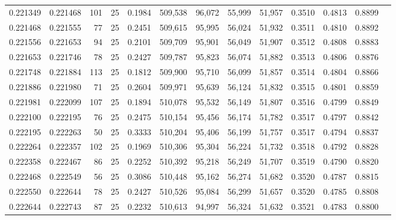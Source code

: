 \begin{tabular}{rrrrrrrrrrrrr}
0.221349 & 0.221468 &   101 &  25 &                                     0.1984 & 509,538 &  96,072 &  55,999 &  51,957 & 0.3510 & 0.4813 & 0.8899 \\
0.221468 & 0.221555 &    77 &  25 &                                     0.2451 & 509,615 &  95,995 &  56,024 &  51,932 & 0.3511 & 0.4810 & 0.8892 \\
0.221556 & 0.221653 &    94 &  25 &                                     0.2101 & 509,709 &  95,901 &  56,049 &  51,907 & 0.3512 & 0.4808 & 0.8883 \\
0.221653 & 0.221746 &    78 &  25 &                                     0.2427 & 509,787 &  95,823 &  56,074 &  51,882 & 0.3513 & 0.4806 & 0.8876 \\
0.221748 & 0.221884 &   113 &  25 &                                     0.1812 & 509,900 &  95,710 &  56,099 &  51,857 & 0.3514 & 0.4804 & 0.8866 \\
0.221886 & 0.221980 &    71 &  25 &                                     0.2604 & 509,971 &  95,639 &  56,124 &  51,832 & 0.3515 & 0.4801 & 0.8859 \\
0.221981 & 0.222099 &   107 &  25 &                                     0.1894 & 510,078 &  95,532 &  56,149 &  51,807 & 0.3516 & 0.4799 & 0.8849 \\
0.222100 & 0.222195 &    76 &  25 &                                     0.2475 & 510,154 &  95,456 &  56,174 &  51,782 & 0.3517 & 0.4797 & 0.8842 \\
0.222195 & 0.222263 &    50 &  25 &                                     0.3333 & 510,204 &  95,406 &  56,199 &  51,757 & 0.3517 & 0.4794 & 0.8837 \\
0.222264 & 0.222357 &   102 &  25 &                                     0.1969 & 510,306 &  95,304 &  56,224 &  51,732 & 0.3518 & 0.4792 & 0.8828 \\
0.222358 & 0.222467 &    86 &  25 &                                     0.2252 & 510,392 &  95,218 &  56,249 &  51,707 & 0.3519 & 0.4790 & 0.8820 \\
0.222468 & 0.222549 &    56 &  25 &                                     0.3086 & 510,448 &  95,162 &  56,274 &  51,682 & 0.3520 & 0.4787 & 0.8815 \\
0.222550 & 0.222644 &    78 &  25 &                                     0.2427 & 510,526 &  95,084 &  56,299 &  51,657 & 0.3520 & 0.4785 & 0.8808 \\
0.222644 & 0.222743 &    87 &  25 &                                     0.2232 & 510,613 &  94,997 &  56,324 &  51,632 & 0.3521 & 0.4783 & 0.8800 \\

\end{tabular}
